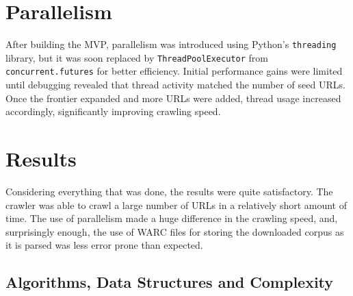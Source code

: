 \section{Parallelism}

After building the MVP, parallelism was introduced using Python's \texttt{threading} library, but it was soon replaced by \texttt{ThreadPoolExecutor} from \texttt{concurrent.futures} for better efficiency. Initial performance gains were limited until debugging revealed that thread activity matched the number of seed URLs. Once the frontier expanded and more URLs were added, thread usage increased accordingly, significantly improving crawling speed.



\section{Results}

Considering everything that was done, the results were quite satisfactory. The crawler was able to crawl a large number of URLs in a relatively short amount of time. The use of parallelism made a huge difference in the crawling speed, and, surprisingly enough, the use of WARC files for storing the downloaded corpus as it is parsed was less error prone than expected.

\subsection{Algorithms, Data Structures and Complexity}

